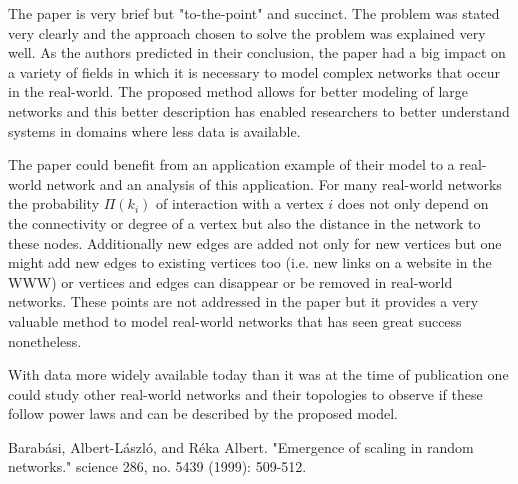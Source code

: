 \documentclass[12pt]{article}
\begin{document}
The paper is very brief but "to-the-point" and succinct. The problem was stated very clearly and the approach chosen to solve the problem was explained very well. As the authors predicted in their conclusion, the paper had a big impact on a variety of fields in which it is necessary to model complex networks that occur in the real-world. The proposed method allows for better modeling of large networks and this better description has enabled researchers to better understand systems in domains where less data is available.

The paper could benefit from an application example of their model to a real-world network and an analysis of this application. For many real-world networks the probability $\Pi(k_i)$ of interaction with a vertex $i$ does not only depend on the connectivity or degree of a vertex but also the distance in the network to these nodes. Additionally new edges are added not only for new vertices but one might add new edges to existing vertices too (i.e. new links on a website in the WWW) or vertices and edges can disappear or be removed in real-world networks. These points are not addressed in the paper but it provides a very valuable method to model real-world networks that has seen great success nonetheless.

With data more widely available today than it was at the time of publication one could study other real-world networks and their topologies to observe if these follow power laws and can be described by the proposed model.


\begin{thebibliography}{9}
Barabási, Albert-László, and Réka Albert. "Emergence of scaling in random networks." science 286, no. 5439 (1999): 509-512.

\end{thebibliography}
 
\end{document}
